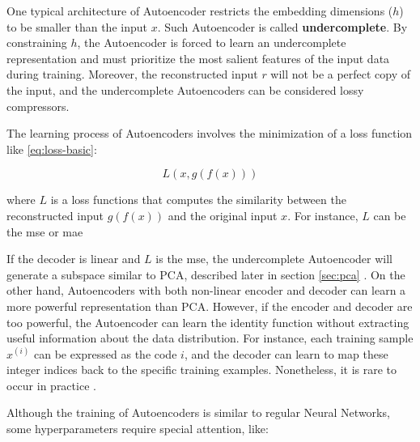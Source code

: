 One typical architecture of Autoencoder restricts the embedding dimensions ($h$) to be smaller than the input $x$. Such Autoencoder is called \textbf{undercomplete}. By constraining $h$, the Autoencoder is forced to learn an undercomplete representation and must prioritize the most salient features of the input data during training. Moreover, the reconstructed input $r$ will not be a perfect copy of the input, and the undercomplete Autoencoders can be considered lossy compressors.

The learning process of Autoencoders involves the minimization of a loss function like \autoref{eq:loss-basic}:

\begin{equation}
\label{eq:loss-basic}
L(x, g(f(x)))
\end{equation}

\noindent
where $L$ is a loss functions that computes the similarity between the reconstructed input $g(f(x))$ and the original input $x$. For instance, $L$ can be the \acf{mse} or \acf{mae}

If the decoder is linear and $L$ is the \acs{mse}, the undercomplete Autoencoder will generate a subspace similar to PCA, described later in section \ref{sec:pca} \citep{lecun2015deep}. On the other hand, Autoencoders with both non-linear encoder and decoder can learn a more powerful representation than PCA. However, if the encoder and decoder are too powerful, the Autoencoder can learn the identity function without extracting useful information about the data distribution. For instance, each training sample $x^{(i)}$ can be expressed as the code $i$, and the decoder can learn to map these integer indices back to the specific training examples. Nonetheless, it is rare to occur in practice \citep{lecun2015deep}.

Although the training of Autoencoders is similar to regular Neural Networks, some hyperparameters require special attention, like:

